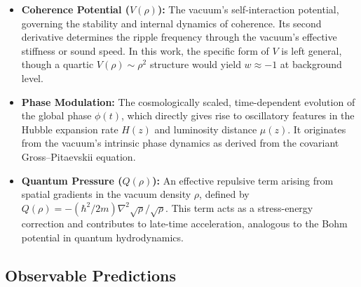\begin{itemize}[leftmargin=*]
    \item \textbf{Coherence Potential (\( V(\rho) \)):} The vacuum’s self-interaction potential, governing the stability and internal dynamics of coherence. Its second derivative determines the ripple frequency through the vacuum's effective stiffness or sound speed. In this work, the specific form of \( V \) is left general, though a quartic \( V(\rho) \sim \rho^2 \) structure would yield \( w \approx -1 \) at background level.

    \item \textbf{Phase Modulation:} The cosmologically scaled, time-dependent evolution of the global phase \( \phi(t) \), which directly gives rise to oscillatory features in the Hubble expansion rate \( H(z) \) and luminosity distance \( \mu(z) \). It originates from the vacuum’s intrinsic phase dynamics as derived from the covariant Gross–Pitaevskii equation.

    \item \textbf{Quantum Pressure (\( Q(\rho) \)):} An effective repulsive term arising from spatial gradients in the vacuum density \( \rho \), defined by \( Q(\rho) = -(\hbar^2 / 2m) \nabla^2 \sqrt{\rho} / \sqrt{\rho} \). This term acts as a stress-energy correction and contributes to late-time acceleration, analogous to the Bohm potential in quantum hydrodynamics.
\end{itemize}

\subsection{Observable Predictions}

